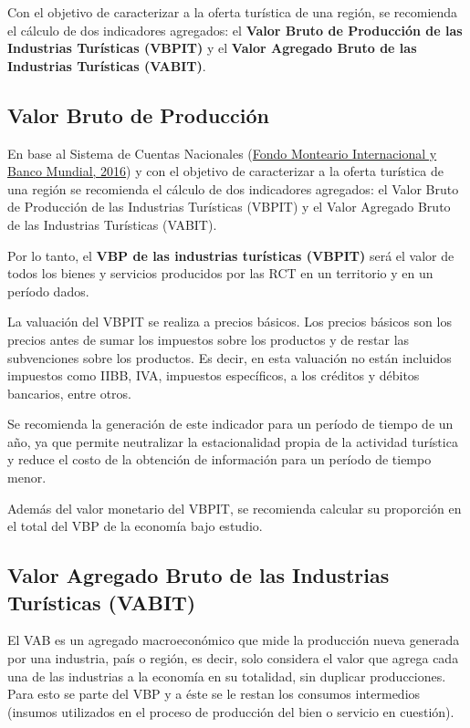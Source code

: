 \documentclass[
  openany]{book}
\begin{document}
Con el objetivo de caracterizar a la oferta turística de una región, se recomienda el cálculo de dos indicadores agregados: el \textbf{Valor Bruto de Producción de las Industrias Turísticas (VBPIT)} y el \textbf{Valor Agregado Bruto de las Industrias Turísticas (VABIT)}.

\hypertarget{valor-bruto-de-produccion}{%
\subsection{Valor Bruto de Producción}\label{valor-bruto-de-produccion}}

En base al Sistema de Cuentas Nacionales (\protect\hyperlink{ref-scn2008}{Fondo Monteario Internacional y Banco Mundial, 2016}) y con el objetivo de caracterizar a la oferta turística de una región se recomienda el cálculo de dos indicadores agregados: el Valor Bruto de Producción de las Industrias Turísticas (VBPIT) y el Valor Agregado Bruto de las Industrias Turísticas (VABIT).

Por lo tanto, el \textbf{VBP de las industrias turísticas (VBPIT)} será el valor de todos los bienes y servicios producidos por las RCT en un territorio y en un período dados.

La valuación del VBPIT se realiza a precios básicos. Los precios básicos son los precios antes de sumar los impuestos sobre los productos y de restar las subvenciones sobre los productos. Es decir, en esta valuación no están incluidos impuestos como IIBB, IVA, impuestos específicos, a los créditos y débitos bancarios, entre otros.

Se recomienda la generación de este indicador para un período de tiempo de un año, ya que permite neutralizar la estacionalidad propia de la actividad turística y reduce el costo de la obtención de información para un período de tiempo menor.

Además del valor monetario del VBPIT, se recomienda calcular su proporción en el total del VBP de la economía bajo estudio.

\hypertarget{valor-agregado-bruto-de-las-industrias-turuxedsticas-vabit}{%
\subsection{Valor Agregado Bruto de las Industrias Turísticas (VABIT)}\label{valor-agregado-bruto-de-las-industrias-turuxedsticas-vabit}}

El VAB es un agregado macroeconómico que mide la producción nueva generada por una industria, país o región, es decir, solo considera el valor que agrega cada una de las industrias a la economía en su totalidad, sin duplicar producciones. Para esto se parte del VBP y a éste se le restan los consumos intermedios (insumos utilizados en el proceso de producción del bien o servicio en cuestión).
\end{document}
